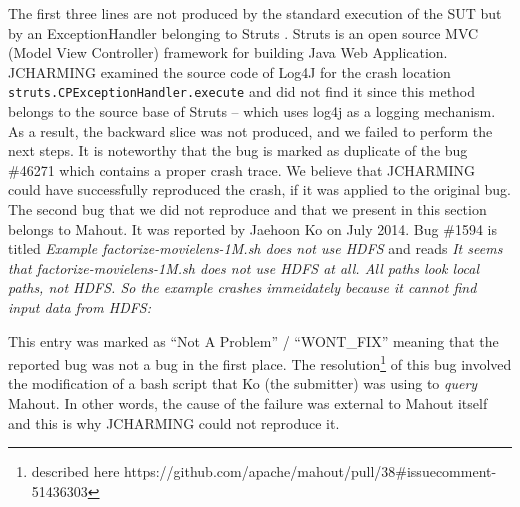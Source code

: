 \documentclass[times]{smrauth}
\begin{document}
\vspace*{0.3cm}


The first three lines are not produced by the standard
execution of the SUT but by an ExceptionHandler belonging
to Struts \cite{ApacheSoftwareFoundation2000}. Struts is an open source MVC (Model View
Controller) framework for building Java Web Application.
JCHARMING examined the source code of Log4J for the
crash location {\tt struts.CPExceptionHandler.execute} and did not
find it since this method belongs to the source base of Struts
-- which uses log4j as a logging mechanism. As a result, the
backward slice was not produced, and we failed to perform the
next steps. It is noteworthy that the bug is marked as duplicate
of the bug \#46271 which contains a proper crash trace. We
believe that JCHARMING could have successfully
reproduced the crash, if it was applied to the original bug. \\

The second bug that we did not reproduce and 
that we present in this section belongs to Mahout. It was reported by  
Jaehoon Ko on July 2014. Bug \#1594 is titled {\it Example factorize-movielens-1M.sh does not use HDFS}
and reads {\it It seems that factorize-movielens-1M.sh does not use HDFS at all. 
All paths look local paths, not HDFS. So the example crashes 
immeidately because it cannot find input data from HDFS: }

\vspace*{0.3cm}

\noindent{}

\vspace*{0.3cm}

This entry was marked as ``Not A Problem'' / ``WONT\_FIX'' meaning that 
the reported bug was not a bug in the first place. 
The resolution\footnote{described here https://github.com/apache/mahout/pull/38\#issuecomment-51436303} of this bug 
involved the modification of a bash script that Ko (the submitter) was using to {\it query} Mahout. In other words, the cause of the failure was external to Mahout itself and this is why JCHARMING could not reproduce it.
\end{document}
